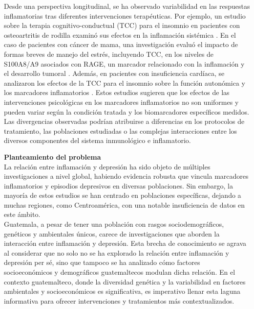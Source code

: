 \documentclass[jou]{apa7}
\begin{document}
	Desde una perspectiva longitudinal, se ha observado variabilidad en las respuestas inflamatorias tras diferentes intervenciones terapéuticas. Por ejemplo, un estudio sobre la terapia cognitivo-conductual (TCC) para el insomnio en pacientes con osteoartritis de rodilla examinó sus efectos en la inflamación sistémica \parencite{munPreliminaryExaminationEffects2024}. En el caso de pacientes con cáncer de mama, una investigación evaluó el impacto de formas breves de manejo del estrés, incluyendo TCC, en los niveles de S100A8/A9 asociados con RAGE, un marcador relacionado con la inflamación y el desarrollo tumoral \parencite{taubEffectsRandomizedTrial2019}. Además, en pacientes con insuficiencia cardíaca, se analizaron los efectos de la TCC para el insomnio sobre la función autonómica y los marcadores inflamatorios \parencite{redekerEffectsCognitiveBehavioral2020}. Estos estudios sugieren que los efectos de las intervenciones psicológicas en los marcadores inflamatorios no son uniformes y pueden variar según la condición tratada y los biomarcadores específicos medidos. Las divergencias observadas podrían atribuirse a diferencias en los protocolos de tratamiento, las poblaciones estudiadas o las complejas interacciones entre los diversos componentes del sistema inmunológico e inflamatorio.
	
	\textbf{Planteamiento del problema}\\
	
	La relación entre inflamación y depresión ha sido objeto de múltiples
	investigaciones a nivel global, habiendo evidencia robusta que vincula
	marcadores inflamatorios y episodios depresivos en diversas poblaciones.
	Sin embargo, la mayoría de estos estudios se han centrado en poblaciones
	específicas, dejando a muchas regiones, como Centroamérica, con una
	notable insuficiencia de datos en este ámbito.\\
	
	Guatemala, a pesar de tener una población con rasgos sociodemográficos,
	genéticos y ambientales únicos, carece de investigaciones que aborden la
	interacción entre inflamación y depresión. Esta brecha de conocimiento
	se agrava al considerar que no solo no se ha explorado la relación entre
	inflamación y depresión per sé, sino que tampoco se ha analizado cómo
	factores socioeconómicos y demográficos guatemaltecos modulan dicha
	relación. En el contexto guatemalteco, donde la diversidad genética y la
	variabilidad en factores ambientales y socioeconómicos es significativa,
	es imperativo llenar esta laguna informativa para ofrecer intervenciones
	y tratamientos más contextualizados.
	
\end{document}
